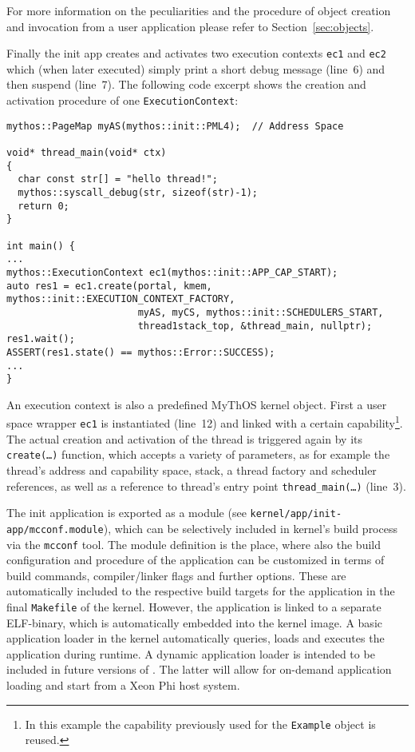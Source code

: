 For more information on the peculiarities
and the procedure of object creation and invocation from a user application
please refer to Section~\ref{sec:objects}.
 
Finally the init app creates and activates two execution contexts \texttt{ec1}
and \texttt{ec2} which (when later executed) simply print a short debug message
(line~6) and then suspend (line~7). The following code excerpt shows the
creation and activation procedure of one \texttt{ExecutionContext}:
 
\lstset{language=c++}
\begin{lstlisting}
mythos::PageMap myAS(mythos::init::PML4);  // Address Space

void* thread_main(void* ctx)
{
  char const str[] = "hello thread!";
  mythos::syscall_debug(str, sizeof(str)-1);
  return 0;
}

int main() {
...
mythos::ExecutionContext ec1(mythos::init::APP_CAP_START);
auto res1 = ec1.create(portal, kmem, mythos::init::EXECUTION_CONTEXT_FACTORY,
                       myAS, myCS, mythos::init::SCHEDULERS_START,
                       thread1stack_top, &thread_main, nullptr);
res1.wait();
ASSERT(res1.state() == mythos::Error::SUCCESS);
...
}
\end{lstlisting}

An execution context is also a predefined MyThOS kernel object.
First a user space wrapper \texttt{ec1} is instantiated (line~12) and linked
with a certain capability\footnote{In this example the capability previously
used for the \texttt{Example} object is reused.}.
The actual creation and activation of the thread is triggered again by its
\texttt{create(\ldots)} function, which accepts a variety of parameters, as for
example the thread's address and capability space, stack, a thread factory and
scheduler references, as well as a reference to thread's entry point
\texttt{thread\_main(\ldots)} (line~3).

The init application is exported as a module (see
\texttt{kernel/app/init-app/mcconf.module}), which can be selectively included
in kernel's build process via the \texttt{mcconf} tool. The module definition is
the place, where also the build configuration and procedure of the application
can be customized in terms of build commands, compiler/linker flags and further
options. These are automatically included to the respective build targets for
the application in the final \texttt{Makefile} of the kernel. However, the
application is linked to a separate ELF-binary, which is automatically embedded
into the kernel image. A basic application loader in the kernel automatically
queries, loads and executes the application during runtime.
A dynamic application loader is intended to be included in future versions of
\mythos. The latter will allow for on-demand application loading and start from
a Xeon Phi host system.

